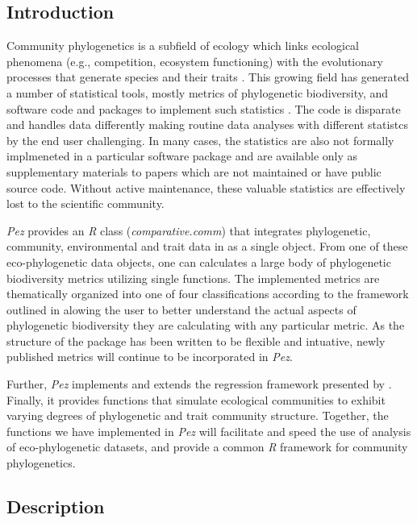 \documentclass[11pt]{article} %
\begin{document}
\subsection*{Introduction}
Community phylogenetics is a subfield of ecology which links ecological phenomena (e.g., competition, ecosystem functioning)
with the evolutionary processes that generate species and their traits
\autocite[see][]{Webb2002,Cavender-Bares2009}. This growing field has
generated a number of statistical tools, mostly metrics of phylogenetic biodiversity, and software code and packages to implement such statistics
\autocite[notably][]{Webb2008,Regetz2009,Kembel2010,Orme2013,Eastman2013}. The code is disparate and handles data differently 
making routine data analyses with different statistcs by the end user challenging. In many cases, the statistics are also not formally implmeneted in a particular software package and are available only as supplementary materials to papers which are not
maintained or have public source code. Without active maintenance, these valuable statistics are effectively lost to
the scientific community.

\emph{Pez} provides an \emph{R} class (\emph{comparative.comm}) that
integrates phylogenetic, community, environmental and trait data in as
a single object. From one of these eco-phylogenetic data objects, one can calculates a large body of phylogenetic biodiversity metrics utilizing single functions. The implemented metrics are thematically organized into one of four classifications according to the framework outlined in \textcite{Pearse2014review} alowing the user to better understand the actual aspects of phylogenetic biodiversity they are calculating with any particular metric. As the structure of the package has been written to be flexible and intuative, newly published metrics will continue to be incorporated in \emph{Pez}. 

Further, \emph{Pez} implements and extends the regression framework presented
by \parencite{Cavender-Bares2004} \autocite[see
also][]{Cavender-Bares2006}. Finally, it provides functions that simulate ecological communities to exhibit varying degrees of phylogenetic and trait community structure. Together, the functions we have implemented in \emph{Pez} will facilitate and speed the use of analysis of eco-phylogenetic
datasets, and provide a common \emph{R} framework for community phylogenetics.
\subsection*{Description}
\end{document}
